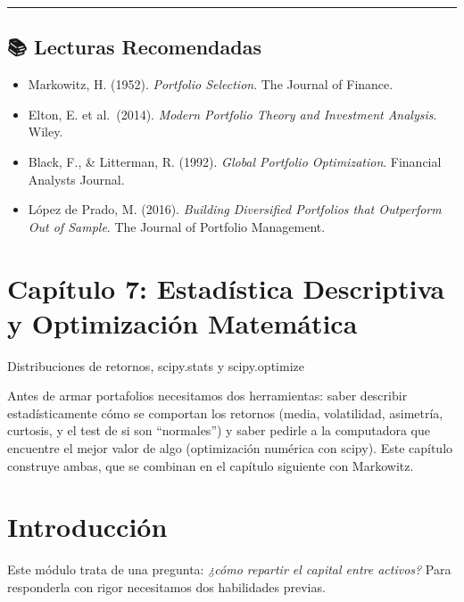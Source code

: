 \documentclass[
  spanish,
  letterpaper,
  DIV=11,
  numbers=noendperiod]{scrreprt}
\providecommand{\tightlist}{%
  \setlength{\itemsep}{0pt}\setlength{\parskip}{0pt}}
\begin{document}
\begin{center}\rule{0.5\linewidth}{0.5pt}\end{center}

\section*{📚 Lecturas Recomendadas}\label{lecturas-recomendadas-1}


\begin{itemize}
\tightlist
\item
  Markowitz, H. (1952). \emph{Portfolio Selection}. The Journal of
  Finance.
\item
  Elton, E. et al.~(2014). \emph{Modern Portfolio Theory and Investment
  Analysis}. Wiley.
\item
  Black, F., \& Litterman, R. (1992). \emph{Global Portfolio
  Optimization}. Financial Analysts Journal.
\item
  López de Prado, M. (2016). \emph{Building Diversified Portfolios that
  Outperform Out of Sample}. The Journal of Portfolio Management.
\end{itemize}

\chapter{Capítulo 7: Estadística Descriptiva y Optimización
Matemática}\label{capuxedtulo-7-estaduxedstica-descriptiva-y-optimizaciuxf3n-matemuxe1tica}

Distribuciones de retornos, scipy.stats y scipy.optimize

Antes de armar portafolios necesitamos dos herramientas: saber describir
estadísticamente cómo se comportan los retornos (media, volatilidad,
asimetría, curtosis, y el test de si son ``normales'') y saber pedirle a
la computadora que encuentre el mejor valor de algo (optimización
numérica con scipy). Este capítulo construye ambas, que se combinan en
el capítulo siguiente con Markowitz.

\hfill\break

\chapter{Introducción}\label{introducciuxf3n-6}

Este módulo trata de una pregunta: \emph{¿cómo repartir el capital entre
activos?} Para responderla con rigor necesitamos dos habilidades
previas.
\end{document}
